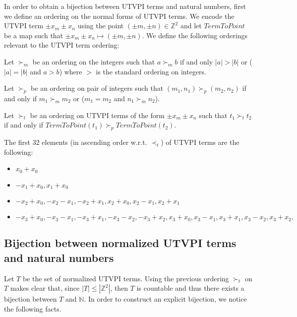 In order to obtain a bijection between UTVPI terms and
natural numbers, first we define an ordering on the normal forms 
of UTVPI terms. 
We encode the UTVPI term $\pm x_m \pm x_n$ using the point
$(\pm m, \pm n) \in \mathbb{Z}^2$ and let $TermToPoint$ be a 
map such that $\pm x_m \pm x_n \mapsto (\pm m, \pm n)$. 
We define the following orderings relevant to the 
UTVPI term ordering:

\begin{definition} 
  Let $\succ_m$ be an ordering on the integers such that $a \succ_m b$
  if and only $|a| > |b|$ or ($|a| = |b|$ and $a > b$) where $>$ is the
  standard ordering on integers.

  Let $\succ_p$ be an ordering on pair of integers such that 
  $(m_1, n_1) \succ_p (m_2, n_2)$ if and only if $m_1 \succ_m m_2$
  or ($m_1 = m_2$ and $n_1 \succ_m n_2$).

  Let $\succ_t$ be an ordering on UTVPI terms of the 
  form $\pm x_m \pm x_n$ such that $t_1 \succ_t t_2$ 
  if and only if $TermToPoint(t_1) \succ_p TermToPoint(t_2)$.
\end{definition}

\begin{example} \label{example_oct}
  The first 32 elements (in ascending order w.r.t. $\prec_t$) of UTVPI
  terms are the following:
  \begin{itemize}

    \item $x_0 + x_0$

    \item $-x_1 + x_0, x_1 + x_0$ 

    \item $-x_{2} + x_{0}, -x_{2} - x_{1}, -x_{2} + x_{1},
      x_{2} + x_{0}, x_{2} - x_{1}, x_{2} + x_{1}$

    \item $-x_{3} + x_{0}, -x_{3} - x_{1}, 
      -x_{3} + x_{1}, -x_{3} - x_{2}, 
      -x_{3} + x_{2},
      x_{3} + x_{0}, x_{3} - x_{1}, x_{3} + x_{1}, 
      x_{3} - x_{2}, x_{3} + x_{2}, 
      $
  \end{itemize}
\end{example}

\subsection{Bijection between normalized UTVPI terms and 
natural numbers}

Let $T$ be the set of normalized UTVPI terms.
Using the previous ordering $\succ_t$ on $T$   
makes clear that, since $|T| \leq 
|\mathbb{Z}^2|$, then $T$ is countable and thus 
there exists a bijection between $T$ and 
$\mathbb{N}$. In order to construct an 
explicit bijection, we notice the following facts.

